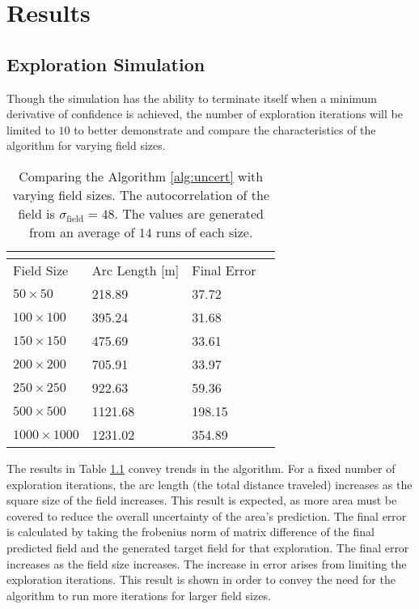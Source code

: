 \chapter{Results}

\section{Exploration Simulation}
Though the simulation has the ability to terminate itself when a minimum derivative of confidence is achieved, the number of exploration iterations will be limited to $10$ to better demonstrate and compare the characteristics of the algorithm for varying field sizes.

\begin{table}
\centering
	\begin{tabular}{ |p{3cm}||p{2cm}|p{3cm}|p{3.5cm}|}
		\hline
		\multicolumn{4}{|c|}{}\\
		\hline
		Field Size          & Arc Length [m] & Final Error \\
		\hline
		$50 \times 50$      & 218.89      & 37.72 \\\hline
		$100 \times 100$    & 395.24      & 31.68 \\\hline
		$150 \times 150$    & 475.69      & 33.61 \\\hline
		$200 \times 200$    & 705.91      & 33.97 \\\hline
		$250 \times 250$    & 922.63      & 59.36 \\\hline
		$500 \times 500$    & 1121.68     & 198.15 \\\hline
		$1000 \times 1000$  & 1231.02     & 354.89 \\\hline
		\hline
	\end{tabular}
	\caption{Comparing the Algorithm \ref{alg:uncert} with varying field sizes. The autocorrelation of the field is $\sigma_{\text{field}} = 48$. The values are generated from an average of $14$ runs of each size.}
    \label{tab:krg_vs_krg}
\end{table}

The results in Table \ref{tab:krg_vs_krg} convey trends in the algorithm. For a fixed number of exploration iterations, the arc length (the total distance traveled) increases as the square size of the field increases. This result is expected, as more area must be covered to reduce the overall uncertainty of the area's prediction. The final error is calculated by taking the frobenius norm of matrix difference of the final predicted field and the generated target field for that exploration. The final error increases as the field size increases. The increase in error arises from limiting the exploration iterations. This result is shown in order to convey the need for the algorithm to run more iterations for larger field sizes.

